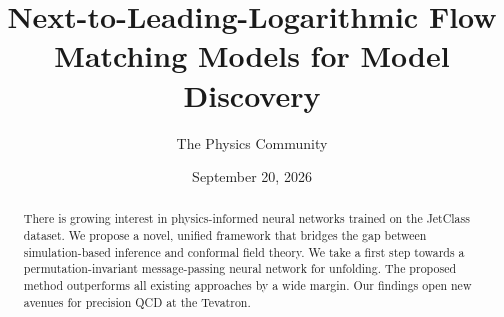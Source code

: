 \documentclass[11pt]{article}
\title{Next-to-Leading-Logarithmic Flow Matching Models for Model Discovery}
\author{The Physics Community}
\date{September 20, 2026}
\numberwithin{equation}{section}
\theoremstyle{definition}
\theoremstyle{remark}
\begin{document}
\maketitle
\begin{abstract}
There is growing interest in physics-informed neural networks trained on
the JetClass dataset. We propose a novel, unified framework that bridges
the gap between simulation-based inference and conformal field theory.
We take a first step towards a permutation-invariant message-passing
neural network for unfolding. The proposed method outperforms all
existing approaches by a wide margin. Our findings open new avenues for
precision QCD at the Tevatron.
\end{abstract}
\tableofcontents



\nocite{*}


\end{document}

